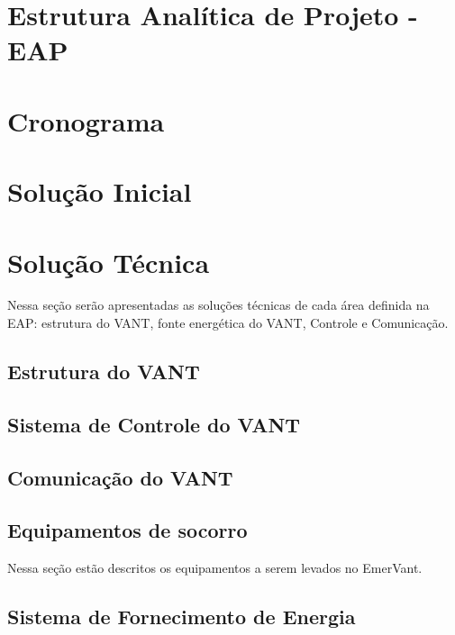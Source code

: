 \section{Estrutura Analítica de Projeto - EAP}
  
 
\section{Cronograma}
  

\section{Solução Inicial}
  

\section{Solução Técnica}
  Nessa seção serão apresentadas as soluções técnicas de cada área definida na EAP: estrutura do VANT,
  fonte energética do VANT, Controle e Comunicação.

\subsection{Estrutura do VANT}
  
  
\subsection{Sistema de Controle do VANT}
  

\subsection{Comunicação do VANT}
  

\subsection{Equipamentos de socorro}
  Nessa seção estão descritos os equipamentos a serem levados no EmerVant.
  
  

\subsection{Sistema de Fornecimento de Energia}
  



